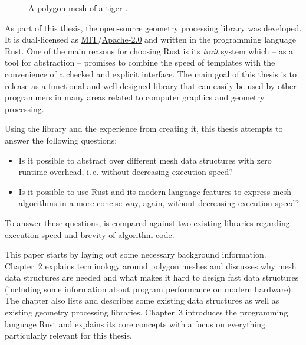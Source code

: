 \vspace{5mm}

\begin{figure}[h]
  \centering
  
  \caption{A polygon mesh of a tiger \cite{tigermodel}.}
\end{figure}

\vspace{1cm}

As part of this thesis, the open-source geometry processing library  was developed.
It is dual-licensed as \hyperlink{mit}{MIT}/\hyperlink{apache2}{Apache-2.0} and written in the programming language Rust.
One of the main reasons for choosing Rust is its \emph{trait} system which -- as a tool for abstraction -- promises to combine the speed of \cpp templates with the convenience of a checked and explicit interface.
The main goal of this thesis is to release  as a functional and well-designed library that can easily be used by other programmers in many areas related to computer graphics and geometry processing.

\newpage

Using the library  and the experience from creating it, this thesis attempts to answer the following questions:

\begin{itemize}
  \item Is it possible to abstract over different mesh data structures with zero runtime overhead, i.\,e. without decreasing execution speed?
  \item Is it possible to use Rust and its modern language features to express mesh algorithms in a more concise way, again, without decreasing execution speed?
\end{itemize}

To answer these questions,  is compared against two existing \cpp libraries regarding execution speed and brevity of algorithm code.

\vspace{1cm}

This paper starts by laying out some necessary background information.
Chapter~2 explains terminology around polygon meshes and discusses why mesh data structures are needed and what makes it hard to design fast data structures (including some information about program performance on modern hardware).
The chapter also lists and describes some existing data structures as well as existing geometry processing libraries.
Chapter~3 introduces the programming language Rust and explains its core concepts with a focus on everything particularly relevant for this thesis.

